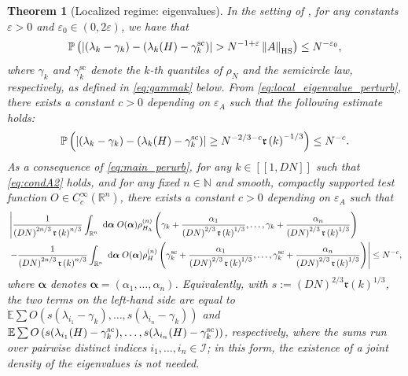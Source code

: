 \documentclass[10pt,reqno]{amsart}
\numberwithin{equation}{section}
\numberwithin{figure}{section}
\theoremstyle{plain} %
\newtheorem{theorem}{Theorem}[section]
\theoremstyle{definition} %
\renewcommand{\txt}[1]{\text{\rm{#1}}}
\renewcommand{\P}{\mathbb{P}}
\newcommand{\E}{\mathbb{E}}
\newcommand{\N}{\mathbb{N}}
\newcommand{\cI}{\mathcal{I}}
\newcommand{\fr}{{\mathfrak{r}}}
\renewcommand{\leq}{\le}
\newcommand{\qq}[1]{[\![{#1}]\!]}
\newcommand{\pa}[1]{\left({#1}\right)}
\newcommand{\norma}[1]{\left\lVert #1 \right\rVert}
\newcommand{\e}{{\varepsilon}}
\newcommand{\HS}{\txt{HS}}
\newcommand{\tsc}{{\mathrm{sc}}}
\numberwithin{equation}{section}
\begin{document}
\begin{theorem}[Localized regime: eigenvalues]\label{theorem_localized_eigenvalue}
In the setting of , for any constants $\varepsilon>0$ and $\varepsilon_0\in\pa{0,2\varepsilon}$, we have that
    \begin{equation}
        \label{eq:local_eigenvalue_perturb}\begin{aligned}
            \P\left( \left|\pa{\lambda_k-\gamma_k}-\pa{\lambda_k(H)-\gamma_{k}^{\tsc}}\right| > N^{-1+\varepsilon}\norma{A}_{\HS}\right)\le N^{-\varepsilon_0},
        \end{aligned}
    \end{equation}
where $\gamma_k$ and $\gamma_k^{\tsc}$ denote the $k$-th quantiles of $\rho_N$ and the semicircle law, respectively, as defined in \eqref{eq:gammak} below. From \eqref{eq:local_eigenvalue_perturb}, there exists a constant $c>0$ depending on $\e_A$ such that the following estimate holds:
\begin{equation}\label{eq:main_perurb}
    \begin{aligned}
        \P\left( \left|\pa{\lambda_k-\gamma_k}-\pa{\lambda_k(H)-\gamma_{k}^{\txt{sc}}}\right| \ge N^{-2/3-c}\fr\pa{k}^{-1/3}\right)\le N^{-c}.
    \end{aligned}
\end{equation}
As a consequence of \eqref{eq:main_perurb}, for any $k\in \qq{1,DN}$ such that \eqref{eq:condA2} holds, and for any fixed $n\in \N$ and smooth, compactly supported test function $O \in C_c^{\infty}\left(\mathbb{R}^n\right)$, there exists a constant $c>0$ depending on $\e_A$ such that
\begin{equation*}
    \begin{aligned}
        &\left|	\frac{1}{\pa{DN}^{2n/3}\fr\pa{k}^{n/3}}\int_{\mathbb{R}^n} \mathrm{~d} \boldsymbol{\alpha}\; O(\boldsymbol{\alpha}) \rho_{H_{\Lambda}}^{(n)}\left(\gamma_k+\frac{\alpha_1}{\pa{DN}^{2/3}\fr\pa{k}^{1/3}  }, \ldots, \gamma_k+\frac{\alpha_n}{\pa{DN}^{2/3}\fr\pa{k}^{1/3}  }\right)\right.\\
        &\left.-\frac{1}{\pa{DN}^{2n/3}\fr\pa{k}^{n/3}}\int_{\mathbb{R}^n} \mathrm{~d} \boldsymbol{\alpha}\; O(\boldsymbol{\alpha})\rho_{H}^{(n)}\left(\gamma_k^{\txt{sc}}+\frac{\alpha_1}{\pa{DN}^{2/3}\fr\pa{k}^{1/3}  }, \ldots, \gamma_k^{\txt{sc}}+\frac{\alpha_n}{\pa{DN}^{2/3}\fr\pa{k}^{1/3}  }\right)   \right|\leq N^{-c},
    \end{aligned}
\end{equation*}
where $\boldsymbol{\alpha}$ denotes $\boldsymbol{\alpha}=\left(\alpha_1, \ldots, \alpha_n\right)$. Equivalently, with $s:=\pa{DN}^{2/3}\fr\pa{k}^{1/3}$, the two terms on the left-hand side are equal to $\E\sum O\pa{s(\lambda_{i_1}-\gamma_k),\ldots,s(\lambda_{i_n}-\gamma_k)}$ and $\E\sum O\pa{s(\lambda_{i_1}(H)-\gamma_k^{\txt{sc}}),\ldots,s(\lambda_{i_n}(H)-\gamma_k^{\txt{sc}})}$, respectively, where the sums run over pairwise distinct indices $i_1,\ldots,i_n\in\cI$; in this form, the existence of a joint density of the eigenvalues is not needed.
\end{theorem}
\end{document}

